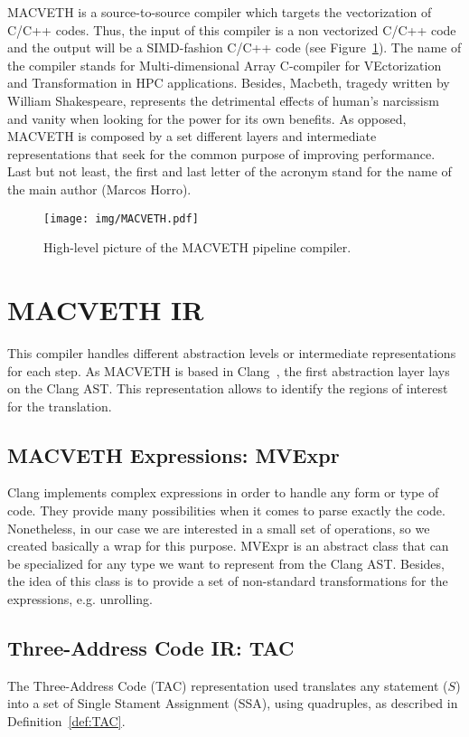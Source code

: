 \documentclass[a4paper,12pt]{memoir}
\begin{document}
MACVETH is a source-to-source compiler which targets the vectorization of C/C++ 
codes. Thus, the input of this compiler is a non vectorized C/C++ code and the 
output will be a SIMD-fashion C/C++ code (see Figure~\ref{fig:MACVETHarch}). 
The name of the compiler stands for Multi-dimensional Array C-compiler for 
VEctorization and Transformation in HPC applications. Besides, Macbeth, tragedy 
written by William Shakespeare, represents the detrimental effects of human's 
narcissism and vanity when looking for the power for its own benefits. As 
opposed, MACVETH is composed by a set different layers and intermediate 
representations that seek for the common purpose of improving performance. Last 
but not least, the first and last letter of the acronym stand for the name of 
the main author (Marcos Horro).

\begin{figure}
	\centering
	\texttt{[image: img/MACVETH.pdf]}
	\caption{High-level picture of the MACVETH pipeline compiler.}
	\label{fig:MACVETHarch}
\end{figure}

\chapter{MACVETH IR}



This compiler handles different abstraction levels or intermediate
representations for each step. As MACVETH is based in Clang~\cite{bib:clang},
the first abstraction layer lays on the Clang AST. This representation allows to
identify the regions of interest for the translation.

\section{MACVETH Expressions: MVExpr}
Clang implements complex expressions in order to handle any form or type of 
code. They 
provide many possibilities
when it comes to parse exactly the code. Nonetheless, in our case we are
interested in a small set of operations, so we created basically a wrap for this
purpose. MVExpr is an abstract class that can be specialized for any type we
want to represent from the Clang AST. Besides, the idea of this class is to
provide a set of non-standard transformations for the expressions, e.g.
unrolling.

\section{Three-Address Code IR: TAC}
The Three-Address Code (TAC) representation used translates any statement ($S$) 
into a
set of Single Stament Assignment (SSA), using quadruples, as described in 
Definition~\ref{def:TAC}.
\end{document}
